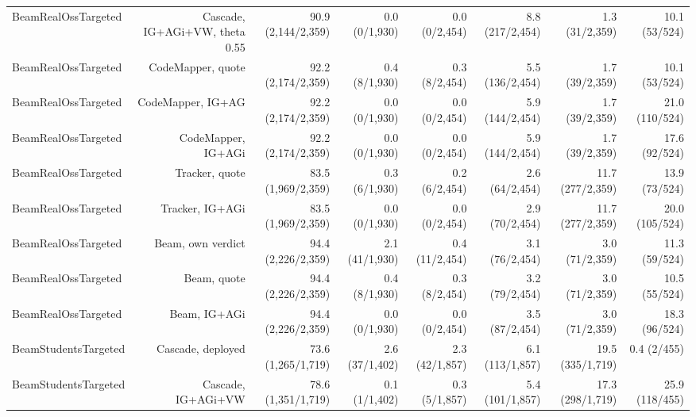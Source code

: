 \begin{table}[t]
{\begin{tabular}{@{}lrrrrrrr@{}}
BeamRealOssTargeted & Cascade, IG+AGi+VW, theta 0.55 & 90.9 (2,144/2,359) & 0.0 (0/1,930) & 0.0 (0/2,454) & 8.8 (217/2,454) & 1.3 (31/2,359) & 10.1 (53/524) \\
BeamRealOssTargeted & CodeMapper, quote & 92.2 (2,174/2,359) & 0.4 (8/1,930) & 0.3 (8/2,454) & 5.5 (136/2,454) & 1.7 (39/2,359) & 10.1 (53/524) \\
BeamRealOssTargeted & CodeMapper, IG+AG & 92.2 (2,174/2,359) & 0.0 (0/1,930) & 0.0 (0/2,454) & 5.9 (144/2,454) & 1.7 (39/2,359) & 21.0 (110/524) \\
BeamRealOssTargeted & CodeMapper, IG+AGi & 92.2 (2,174/2,359) & 0.0 (0/1,930) & 0.0 (0/2,454) & 5.9 (144/2,454) & 1.7 (39/2,359) & 17.6 (92/524) \\
BeamRealOssTargeted & Tracker, quote & 83.5 (1,969/2,359) & 0.3 (6/1,930) & 0.2 (6/2,454) & 2.6 (64/2,454) & 11.7 (277/2,359) & 13.9 (73/524) \\
BeamRealOssTargeted & Tracker, IG+AGi & 83.5 (1,969/2,359) & 0.0 (0/1,930) & 0.0 (0/2,454) & 2.9 (70/2,454) & 11.7 (277/2,359) & 20.0 (105/524) \\
BeamRealOssTargeted & Beam, own verdict & 94.4 (2,226/2,359) & 2.1 (41/1,930) & 0.4 (11/2,454) & 3.1 (76/2,454) & 3.0 (71/2,359) & 11.3 (59/524) \\
BeamRealOssTargeted & Beam, quote & 94.4 (2,226/2,359) & 0.4 (8/1,930) & 0.3 (8/2,454) & 3.2 (79/2,454) & 3.0 (71/2,359) & 10.5 (55/524) \\
BeamRealOssTargeted & Beam, IG+AGi & 94.4 (2,226/2,359) & 0.0 (0/1,930) & 0.0 (0/2,454) & 3.5 (87/2,454) & 3.0 (71/2,359) & 18.3 (96/524) \\
BeamStudentsTargeted & Cascade, deployed & 73.6 (1,265/1,719) & 2.6 (37/1,402) & 2.3 (42/1,857) & 6.1 (113/1,857) & 19.5 (335/1,719) & 0.4 (2/455) \\
BeamStudentsTargeted & Cascade, IG+AGi+VW & 78.6 (1,351/1,719) & 0.1 (1/1,402) & 0.3 (5/1,857) & 5.4 (101/1,857) & 17.3 (298/1,719) & 25.9 (118/455) \\
\bottomrule
\end{tabular}
}
\end{table}

